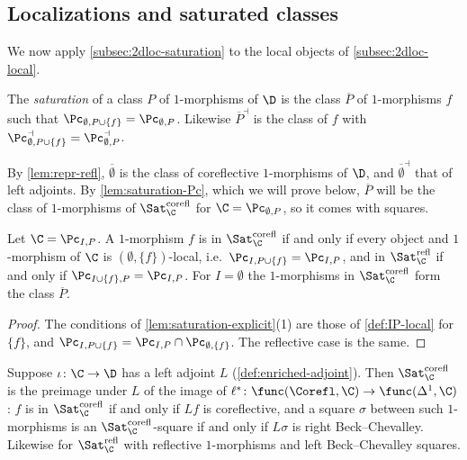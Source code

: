 \subsection{Localizations and saturated classes}
\label{subsec:2dloc-sat-loc}

We now apply \cref{subsec:2dloc-saturation} to the local objects of \cref{subsec:2dloc-local}.

\begin{defi}
\label{def:saturation}
The \emph{saturation} of a class $P$ of $1$-morphisms of $\D$ is the class $\overline{P}$ of $1$-morphisms $f$ such that $\Pc_{\emptyset,P \cup \{f\}} = \Pc_{\emptyset,P}$. Likewise $\overline{P}^{\dashv}$ is the class of $f$ with $\Pc^{\dashv}_{\emptyset,P \cup \{f\}} = \Pc^{\dashv}_{\emptyset,P}$.
\end{defi}

By \cref{lem:repr-refl}, $\overline{\emptyset}$ is the class of coreflective $1$-morphisms of $\D$, and $\overline{\emptyset}^{\dashv}$ that of left adjoints. By \cref{lem:saturation-Pc}, which we will prove below, $\overline{P}$ will be the class of $1$-morphisms of $\Sat^{\mathrm{corefl}}_{\C}$ for $\C = \Pc_{\emptyset,P}$, so it comes with squares.

\begin{lem}
\label{lem:saturation-Pc}
Let $\C = \Pc_{I,P}$. A $1$-morphism $f$ is in $\Sat^{\mathrm{corefl}}_{\C}$ if and only if every object and $1$-morphism of $\C$ is $(\emptyset,\{f\})$-local, i.e.\ $\Pc_{I,P \cup \{f\}} = \Pc_{I,P}$, and in $\Sat^{\mathrm{refl}}_{\C}$ if and only if $\Pc_{I \cup \{f\},P} = \Pc_{I,P}$. For $I = \emptyset$ the $1$-morphisms in $\Sat^{\mathrm{corefl}}_{\C}$ form the class $\overline{P}$.
\end{lem}

\begin{proof}
The conditions of \cref{lem:saturation-explicit}(1) are those of \cref{def:IP-local} for $\{f\}$, and $\Pc_{I,P \cup \{f\}} = \Pc_{I,P} \cap \Pc_{\emptyset,\{f\}}$. The reflective case is the same.
\end{proof}

\begin{prop}
\label{prop:saturation-L}
Suppose $\iota\colon \C \to \D$ has a left adjoint $L$ (\cref{def:enriched-adjoint}). Then $\Sat^{\mathrm{corefl}}_{\C}$ is the preimage under $L$ of the image of $\ell^{*}\colon \func(\Corefl,\C) \to \func(\Delta^{1},\C)$: $f$ is in $\Sat^{\mathrm{corefl}}_{\C}$ if and only if $Lf$ is coreflective, and a square $\sigma$ between such $1$-morphisms is an $\Sat^{\mathrm{corefl}}_{\C}$-square if and only if $L\sigma$ is right Beck--Chevalley. Likewise for $\Sat^{\mathrm{refl}}_{\C}$ with reflective $1$-morphisms and left Beck--Chevalley squares.
\end{prop}

